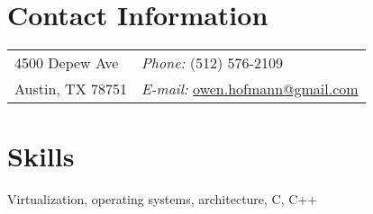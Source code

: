
\section{Contact Information}
%
%
%
\newlength{\rcollength}\setlength{\rcollength}{2.25in}%
%
\begin{tabular}[t]{@{}p{\textwidth-\rcollength}p{\rcollength}}
4500 Depew Ave &
   \textit{Phone:} (512) 576-2109 \\
Austin, TX 78751 &
   \textit{E-mail:} \href{mailto:owen.hofmann@gmail.com}{owen.hofmann@gmail.com} \\
\end{tabular}

\bigskip

\section{Skills}
%
Virtualization, operating systems, architecture, C, C++

\bigskip
